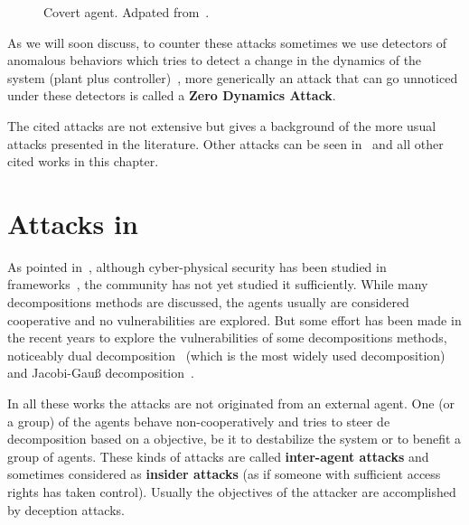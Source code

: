 \documentclass[../main.tex]{subfiles}
\begin{document}
\begin{figure}[h]
{
}
\caption[Covert agent.]{Covert agent. Adpated from~\cite{Smith2015,BarboniEtAl2020}.}\label{fig:covert_attack}
\end{figure}

As we will soon discuss, to counter these attacks sometimes we use detectors of anomalous behaviors which tries to detect a change in the dynamics of the system (plant plus controller)~\cite{TeixeiraEtAl2012,TeixeiraEtAl2015,HoehnZhang2016}, more generically an attack that can go unnoticed under these detectors is called a \textbf{Zero Dynamics Attack}.

The cited attacks are not extensive but gives a background of the more usual attacks presented in the literature.
Other attacks can be seen in~\cite{TeixeiraEtAl2015,ZhangEtAl2021b} and all other cited works in this chapter.

\section{Attacks in \dmpc{}}\label{sec:attacks_in_dmpc}
As pointed in~\cite{ArauzEtAl2021}, although cyber-physical security has been studied in \mpc{} frameworks~\cite{SunYang2019,FranzeEtAl2022}, the \dmpc{} community has not yet studied it sufficiently.
While many decompositions methods are discussed, the agents usually are considered cooperative and no vulnerabilities are explored.
But some effort has been made in the recent years to explore the vulnerabilities of some decompositions methods, noticeably dual decomposition~\cite{VelardeEtAl2017b,VelardeEtAl2017a,VelardeEtAl2018,AnandutaEtAl2018,AnandutaEtAl2019,AnandutaEtAl2020} (which is the most widely used decomposition) and Jacobi-Gauß decomposition~\cite{ChanfreutEtAl2018}.

In all these works the attacks are not originated from an external agent.
One (or a group) of the agents  behave non-cooperatively and tries to steer de decomposition based on a objective, be it to destabilize the system or to benefit a group of agents.
These kinds of attacks are called \textbf{inter-agent attacks} and sometimes considered as \textbf{insider attacks} (as if someone with sufficient access rights has taken control).
Usually the objectives of the attacker are accomplished by deception attacks.
\end{document}
